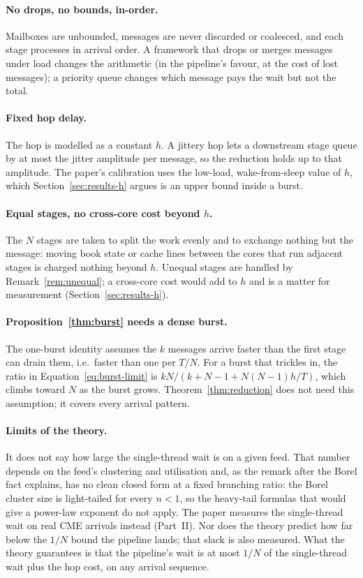 \documentclass[11pt]{article}
\begin{document}
\paragraph{No drops, no bounds, in-order.} Mailboxes are unbounded, messages are never
discarded or coalesced, and each stage processes in arrival order. A framework that drops
or merges messages under load changes the arithmetic (in the pipeline's favour, at the
cost of lost messages); a priority queue changes which message pays the wait but not the
total.

\paragraph{Fixed hop delay.} The hop is modelled as a constant $h$. A jittery hop lets a
downstream stage queue by at most the jitter amplitude per message, so the reduction holds
up to that amplitude. The paper's calibration uses the low-load, wake-from-sleep value of
$h$, which Section~\ref{sec:results-h} argues is an upper bound inside a burst.

\paragraph{Equal stages, no cross-core cost beyond $h$.} The $N$ stages are taken to
split the work evenly and to exchange nothing but the message: moving book state or cache
lines between the cores that run adjacent stages is charged nothing beyond $h$. Unequal
stages are handled by Remark~\ref{rem:unequal}; a cross-core cost would add to $h$ and
is a matter for measurement (Section~\ref{sec:results-h}).

\paragraph{Proposition~\ref{thm:burst} needs a dense burst.} The one-burst identity
assumes the $k$ messages arrive faster than the first stage can drain them, i.e.\ faster
than one per $T/N$. For a burst that trickles in, the ratio in
Equation~\eqref{eq:burst-limit} is $kN / (k + N - 1 + N(N-1)h/T)$, which climbs toward $N$
as the burst grows. Theorem~\ref{thm:reduction} does not need this assumption; it covers
every arrival pattern.

\paragraph{Limits of the theory.} It does not say how large the single-thread
wait is on a given feed. That number depends on the feed's clustering and utilisation and,
as the remark after the Borel fact explains, has no clean closed form at a fixed branching
ratio: the Borel cluster size is light-tailed for every $n < 1$, so the heavy-tail
formulas that would give a power-law exponent do not apply. The paper measures the
single-thread wait on real CME arrivals instead (Part~II). Nor does the theory predict how
far below the $1/N$ bound the pipeline lands; that slack is also measured. What the theory guarantees is that the pipeline's wait is at most $1/N$ of the
single-thread wait plus the hop cost, on any arrival sequence.
\end{document}
